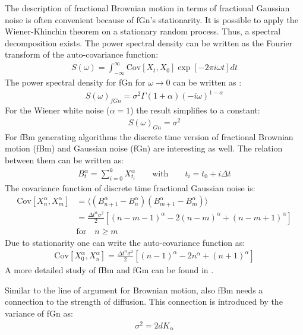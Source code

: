 \documentclass[
  a4paper,BCOR10mm,oneside,
  headsepline,footsepline,%
  fleqn,openbib
]{scrbook}
\begin{document}
The description of fractional Brownian motion in terms of fractional Gaussian noise is often convenient because of fGn's stationarity. It is possible to apply the Wiener-Khinchin theorem on a stationary random process. Thus, a spectral decomposition exists. The power spectral density can be written as the Fourier transform of the auto-covariance function:
\begin{align}
 S(\omega)= \int^{\infty}_{-\infty} \mathrm{Cov}[X_t,X_0] \exp[-2 \pi i \omega t] dt
\end{align}
The power spectral density for fGn for $\omega \longrightarrow 0$ can be written as \cite{Hofling2013}:
\begin{align}
 S(\omega)_{fGn}= \sigma^2 \Gamma(1+\alpha) (-i \omega)^{1-\alpha} \label{powerspec}
\end{align}
For the Wiener white noise ($\alpha=1$) the result simplifies to a constant:
\begin{align}
 S(\omega)_{Gn} = \sigma^2 
\end{align}
For fBm generating algorithms the discrete time version of fractional Brownian motion (fBm) and Gaussian noise (fGn) are interesting as well. The relation between them can be written as:
\begin{align}
B^{\alpha}_{t}= \sum_{i=0}^kX^{\alpha}_{t_i} \qquad \text{with} \qquad t_i= t_0+i \Delta t
\end{align}
The covariance function of discrete time fractional Gaussian noise is:
\begin{align}
 \mathrm{Cov}[X^{\alpha}_n,X^{\alpha}_m]&=\langle (B^{\alpha}_{n+1}-B^{\alpha}_n) (B^{\alpha}_{m+1}-B^{\alpha}_m)\rangle \\ &=\frac{\Delta t^{\alpha} \sigma^2}{2}[(n-m-1)^{\alpha}-2(n-m)^{\alpha}+(n-m+1)^{\alpha}]\\ &  \text{for}  \quad n\geq m
\end{align}
Due to stationarity one can write the auto-covariance function as:
\begin{align}
 \mathrm{Cov}[X^{\alpha}_0,X^{\alpha}_n]=\frac{\Delta t^{\alpha}\sigma^2}{2}[(n-1)^{\alpha}-2n^{\alpha}+(n+1)^{\alpha}] \label{autocovfgn}
\end{align}
A more detailed study of fBm and fGm can be found in \cite{qian2003fractional}.\par \bigskip Similar to the line of argument for Brownian motion, also fBm needs a connection to the strength of diffusion. This connection is introduced by the variance of fGn as: 
\begin{align}
\label{diffusionvariance}
\sigma^2=2dK_{\alpha} 
\end{align}
\end{document}
